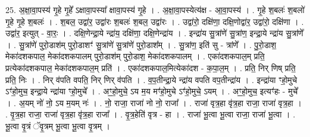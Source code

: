 \documentclass[17pt]{extarticle}
\begin{document}
25. अ॒क्षा॒वा॒पस्य॑ गृ॒हे गृ॒हे᳚ ऽक्षावा॒पस्या᳚ क्षावा॒पस्य॑ गृ॒हे । . अ॒क्षा॒वा॒पस्येत्य॑क्ष - आ॒वा॒पस्य॑ । . गृ॒हे श॒बलः॑ श॒बलो॑ गृ॒हे गृ॒हे श॒बलः॑ । . श॒बल॒ उद्वा॑र॒ उद्वा॑रः श॒बलः॑ श॒बल॒ उद्वा॑रः । . उद्वा॑रो॒ दक्षि॑णा॒ दक्षि॒णोद्वा॑र॒ उद्वा॑रो॒ दक्षि॑णा । . उद्वा॑र॒ इत्युत् - वा॒रः॒ । . दक्षि॒णेन्द्रा॒ये न्द्रा॑य॒ दक्षि॑णा॒ दक्षि॒णेन्द्रा॑य । . इन्द्रा॑य सु॒त्रांणे॑ सु॒त्रांण॒ इन्द्रा॒ये न्द्रा॑य सु॒त्रांणे᳚ । . सु॒त्रांणे॑ पुरो॒डाश॑म् पुरो॒डाशꣳ॑ सु॒त्रांणे॑ सु॒त्रांणे॑ पुरो॒डाश᳚म् । . सु॒त्रांण॒ इति॑ सु - त्रांणे᳚ । . पु॒रो॒डाश॒ मेका॑दशकपाल॒ मेका॑दशकपालम् पुरो॒डाश॑म् पुरो॒डाश॒ मेका॑दशकपालम् । . एका॑दशकपाल॒म् प्रति॒ प्रत्येका॑दशकपाल॒ मेका॑दशकपाल॒म् प्रति॑ । . एका॑दशकपाल॒मित्येका॑दश - क॒पा॒ल॒म् । . प्रति॒ निर् णिष् प्रति॒ प्रति॒ निः । . निर् व॑पति वपति॒ निर् णिर् व॑पति । . व॒प॒तीन्द्रा॒ये न्द्रा॑य वपति वप॒तीन्द्रा॑य । . इन्द्रा॑या ꣳहो॒मुचे ऽꣳ॑हो॒मुच॒ इन्द्रा॒ये न्द्रा॑या ꣳहो॒मुचे᳚ । . अꣳ॒॒हो॒मुचे॒ ऽय म॒य मꣳ॑हो॒मुचे ऽꣳ॑हो॒मुचे॒ ऽयम् । . अꣳ॒॒हो॒मुच॒ इत्यꣳ॑हः - मुचे᳚ । . अ॒यम् नो॑ नो॒ ऽय म॒यम् नः॑ । . नो॒ राजा॒ राजा॑ नो नो॒ राजा᳚ । . राजा॑ वृत्र॒हा वृ॑त्र॒हा राजा॒ राजा॑ वृत्र॒हा । . वृ॒त्र॒हा राजा॒ राजा॑ वृत्र॒हा वृ॑त्र॒हा राजा᳚ । . वृ॒त्र॒हेति॑ वृत्र - हा । . राजा॑ भू॒त्वा भू॒त्वा राजा॒ राजा॑ भू॒त्वा । . भू॒त्वा वृ॒त्रं ॅवृ॒त्रम् भू॒त्वा भू॒त्वा वृ॒त्रम् । \newline
\end{document}
